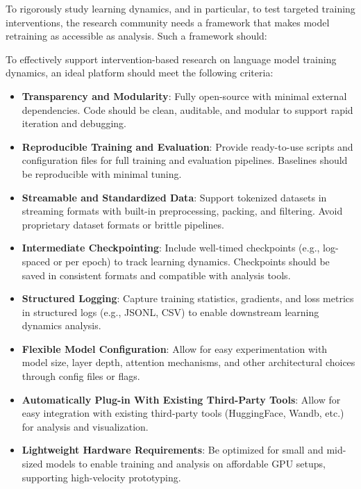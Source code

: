 To rigorously study learning dynamics, and in particular, to test targeted training interventions, the research community needs a framework that makes model retraining as accessible as analysis. Such a framework should:

\begin{tcolorbox}[
    colback=white,
    colframe=thesisblue,
    title=\textbf{Design Requirements for Intervention-Friendly Language Model Platforms},
    fonttitle=\bfseries,
    coltitle=white,
    arc=0mm,
    boxrule=1pt,
    left=10pt,
    right=10pt,
    top=10pt,
    bottom=10pt,
    enhanced,
    breakable
]
To effectively support intervention-based research on language model training dynamics, an ideal platform should meet the following criteria:

\begin{itemize}[label=\cmark]
    \item \textbf{Transparency and Modularity}: Fully open-source with minimal external dependencies. Code should be clean, auditable, and modular to support rapid iteration and debugging.
    
    \item \textbf{Reproducible Training and Evaluation}: Provide ready-to-use scripts and configuration files for full training and evaluation pipelines. Baselines should be reproducible with minimal tuning.
    
    \item \textbf{Streamable and Standardized Data}: Support tokenized datasets in streaming formats with built-in preprocessing, packing, and filtering. Avoid proprietary dataset formats or brittle pipelines.
    
    \item \textbf{Intermediate Checkpointing}: Include well-timed checkpoints (e.g., log-spaced or per epoch) to track learning dynamics. Checkpoints should be saved in consistent formats and compatible with analysis tools.
    
    \item \textbf{Structured Logging}: Capture training statistics, gradients, and loss metrics in structured logs (e.g., JSONL, CSV) to enable downstream learning dynamics analysis.
    
    \item \textbf{Flexible Model Configuration}: Allow for easy experimentation with model size, layer depth, attention mechanisms, and other architectural choices through config files or flags.

    \item \textbf{Automatically Plug-in With Existing Third-Party Tools}: Allow for easy integration with existing third-party tools (HuggingFace, Wandb, etc.) for analysis and visualization.

    
    \item \textbf{Lightweight Hardware Requirements}: Be optimized for small and mid-sized models to enable training and analysis on affordable GPU setups, supporting high-velocity prototyping.
\end{itemize}
\end{tcolorbox}

